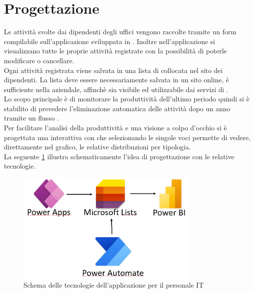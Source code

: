 \section{Progettazione}\label{sec:2App-Progettazione}
Le attività svolte dai dipendenti degli uffici vengono raccolte tramite un form compilabile sull'applicazione sviluppata in .
Inoltre nell'applicazione si visualizzano tutte le proprie attività registrate con la possibilità di poterle modificare o cancellare.\\ 
Ogni attività registrata viene salvata in una lista di  collocata nel sito  dei dipendenti. 
La lista deve essere necessariamente salvata in un sito online, è sufficiente nella  aziendale, affinchè sia visibile ed utilizzabile dai servizi di .\\
Lo scopo principale è di monitorare la produttività dell’ultimo periodo quindi si è stabilito di prevedere l’eliminazione automatica delle attività dopo un anno tramite un flusso .\\
Per facilitare l’analisi della produttività e una visione a colpo d’occhio si è progettata una  interattiva con  che selezionando le singole voci permette di vedere, direttamente nel grafico, le relative distribuzioni per tipologia.\\
La seguente \figurename \space \ref*{fig:IT-Schema} illustra schematicamente l'idea di progettazione con le relative tecnologie.
\begin{figure}[H]
  \centering\includegraphics[width=0.8\textwidth, height=0.8\textheight,keepaspectratio]{immagini/IT-schema.png}
  \caption{Schema delle tecnologie dell'applicazione per il personale IT}
  \label{fig:IT-Schema}
\end{figure}

